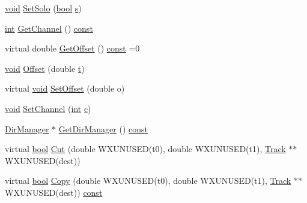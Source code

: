 \begin{DoxyCompactItemize}
\item 
\hyperlink{sound_8c_ae35f5844602719cf66324f4de2a658b3}{void} \hyperlink{class_track_a3e05f682539978be493f9be110082aa3}{Set\+Solo} (\hyperlink{mac_2config_2i386_2lib-src_2libsoxr_2soxr-config_8h_abb452686968e48b67397da5f97445f5b}{bool} \hyperlink{lib_2expat_8h_a755339d27872b13735c2cab829e47157}{s})
\item 
\hyperlink{xmltok_8h_a5a0d4a5641ce434f1d23533f2b2e6653}{int} \hyperlink{class_track_a9c988f7695a546bf52ee2dc859db0345}{Get\+Channel} () \hyperlink{getopt1_8c_a2c212835823e3c54a8ab6d95c652660e}{const} 
\item 
virtual double \hyperlink{class_track_a7dd93b99ae92788d10c3010127002e6e}{Get\+Offset} () \hyperlink{getopt1_8c_a2c212835823e3c54a8ab6d95c652660e}{const}  =0
\item 
\hyperlink{sound_8c_ae35f5844602719cf66324f4de2a658b3}{void} \hyperlink{class_track_a0c71dd844bec490b9a291af9ec2bc127}{Offset} (double \hyperlink{octave__test_8m_aaccc9105df5383111407fd5b41255e23}{t})
\item 
virtual \hyperlink{sound_8c_ae35f5844602719cf66324f4de2a658b3}{void} \hyperlink{class_track_a17a167aaeb971ffb02ca3d62887e69f7}{Set\+Offset} (double o)
\item 
\hyperlink{sound_8c_ae35f5844602719cf66324f4de2a658b3}{void} \hyperlink{class_track_a98d028f4a19322ea675fcd33412f9832}{Set\+Channel} (\hyperlink{xmltok_8h_a5a0d4a5641ce434f1d23533f2b2e6653}{int} \hyperlink{rfft2d_test_m_l_8m_ae0323a9039add2978bf5b49550572c7c}{c})
\item 
\hyperlink{class_dir_manager}{Dir\+Manager} $\ast$ \hyperlink{class_track_aebb3ea6b7d480fad55d543b9ca1a888c}{Get\+Dir\+Manager} () \hyperlink{getopt1_8c_a2c212835823e3c54a8ab6d95c652660e}{const} 
\item 
virtual \hyperlink{mac_2config_2i386_2lib-src_2libsoxr_2soxr-config_8h_abb452686968e48b67397da5f97445f5b}{bool} \hyperlink{class_track_a87915537991939aa4271435995628bac}{Cut} (double W\+X\+U\+N\+U\+S\+ED(t0), double W\+X\+U\+N\+U\+S\+ED(t1), \hyperlink{class_track}{Track} $\ast$$\ast$W\+X\+U\+N\+U\+S\+ED(dest))
\item 
virtual \hyperlink{mac_2config_2i386_2lib-src_2libsoxr_2soxr-config_8h_abb452686968e48b67397da5f97445f5b}{bool} \hyperlink{class_track_ab4090a1d2cf009e12f77ba27b5c3bd34}{Copy} (double W\+X\+U\+N\+U\+S\+ED(t0), double W\+X\+U\+N\+U\+S\+ED(t1), \hyperlink{class_track}{Track} $\ast$$\ast$W\+X\+U\+N\+U\+S\+ED(dest)) \hyperlink{getopt1_8c_a2c212835823e3c54a8ab6d95c652660e}{const} 
\item 

\end{DoxyCompactItemize}
